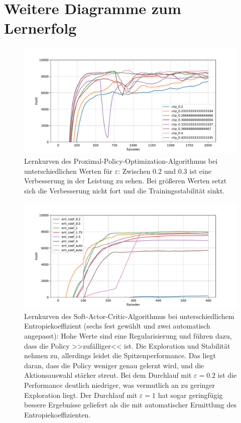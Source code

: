 \section{Weitere Diagramme zum Lernerfolg}
\begin{figure}[htbp]
	\centering
	\includegraphics[width=\textwidth]{appendix/ppo_different_clipping.pdf}
	\caption{
		Lernkurven des Proximal-Policy-Optimization-Algorithmus bei unterschiedlichen Werten für $\varepsilon$:
		Zwischen $0.2$ und $0.3$ ist eine Verbesserung in der Leistung zu sehen.
		Bei größeren Werten setzt sich die Verbesserung nicht fort und die Trainingsstabilität sinkt.
	}
	\label{graphic:PPODifferentClipping}
\end{figure}
\begin{figure}[htbp]
	\centering
	\includegraphics[width=\textwidth]{appendix/sac_temperature.pdf}
	\caption{
		Lernkurven des Soft-Actor-Critic-Algorithmus bei unterschiedlichem Entropiekoeffizient (sechs fest gewählt und zwei automatisch angepasst):
        Hohe Werte sind eine Regularisierung und führen dazu, dass die Policy >>zufälliger<< ist.
        Die Exploration und Stabilität nehmen zu, allerdings leidet die Spitzenperformance.
        Das liegt daran, dass die Policy weniger genau gelernt wird, und die Aktionsauswahl stärker streut.
        Bei dem Durchlauf mit $\varepsilon=0.2$ ist die Performance deutlich niedriger, was vermutlich an zu geringer Exploration liegt.
        Der Durchlauf mit $\varepsilon=1$ hat sogar geringfügig bessere Ergebnisse geliefert als die mit automatischer Ermittlung des Entropiekoeffizienten.
	}
	\label{graphic:SACTemperature}
\end{figure}
